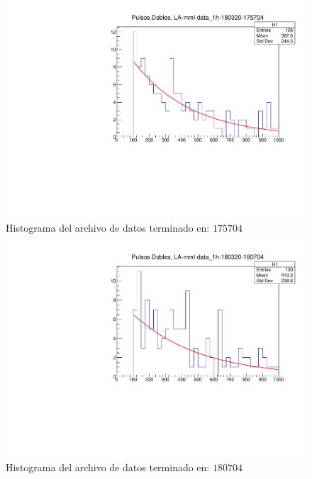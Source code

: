 \documentclass[conference]{IEEEtran}
\begin{document}
        \begin{figure}[H]
            \centering
            \includegraphics[scale=0.45]{./Imagenes/file3.pdf}
            \caption{Histograma del archivo de datos terminado en: $175704$}
            \label{fig:file3}
        \end{figure}  
        \begin{figure}[H]
            \centering
            \includegraphics[scale=0.45]{./Imagenes/file4.pdf}
            \caption{Histograma del archivo de datos terminado en: $180704$}
            \label{fig:file4}
         \end{figure} 
\end{document}
